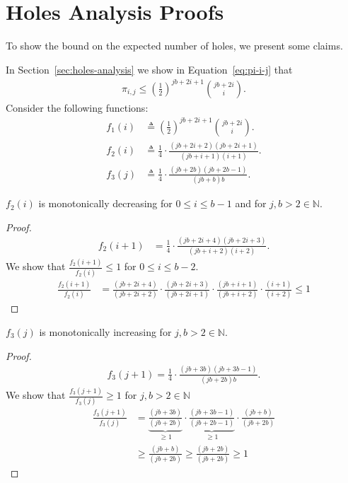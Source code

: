 \chapter{Holes Analysis Proofs}
\label{appendix:holes}

To show the bound on the expected number of holes, we present some claims. 

In Section~\ref{sec:holes-analysis} we show in Equation~\ref{eq:pi-i-j} that 
\begin{align*}
\pi_{i,j} \leq \left(\frac{1}{2}\right)^{jb + 2i +1} {{jb+2i} \choose i}.
\end{align*}
Consider the following functions:
\begin{align*}
f_1(i) &\triangleq \left(\frac{1}{2}\right)^{jb + 2i +1} {{jb+2i} \choose i}. \\
f_2(i) &\triangleq \frac{1}{4} \cdot \frac{(jb+2i+2)(jb+2i+1)}{(jb+i+1)(i+1)}. \\
f_3(j) &\triangleq \frac{1}{4} \cdot \frac{(jb+2b)(jb+2b-1)}{(jb+b)b}.
\end{align*}

\begin{claim}\label{claim:f-2-dec}
$f_2(i)$ is monotonically decreasing for $0 \leq i \leq b-1$ and for $j,b>2 \in \mathds{N}$. 
\end{claim}

\begin{proof}
\begin{align*}
    f_2(i+1) &= \frac{1}{4} \cdot \frac{(jb+2i+4)(jb+2i+3)}{(jb+i+2)(i+2)}.
\end{align*}
We show that $\frac{f_2(i+1)}{f_2(i)} \leq 1$ for $0 \leq i \leq b-2$.
\begin{align*}
    \frac{f_2(i+1)}{f_2(i)} &= \frac{(jb+2i+4)}{(jb+2i+2)} \cdot \frac{(jb+2i+3)}{(jb+2i+1)} \cdot \frac{(jb+i+1)}{(jb+i+2)} \cdot \frac{(i+1)}{(i+2)} 
    \leq 1
\end{align*}
\end{proof}

\begin{claim}\label{claim:f-3-inc}
$f_3(j)$ is monotonically increasing for $j,b>2 \in \mathds{N}$. 
\end{claim}

\begin{proof}
\begin{align*}
    f_3(j+1) = \frac{1}{4} \cdot \frac{(jb+3b)(jb+3b-1)}{(jb+2b)b}.
\end{align*}
We show that $\frac{f_3(j+1)}{f_3(j)} \geq 1$ for $j,b>2 \in \mathds{N}$
\begin{align*}
    \frac{f_3(j+1)}{f_3(j)} &= \underbrace{\frac{(jb+3b)}{(jb+2b)}}_{\geq 1} \cdot \underbrace{\frac{(jb+3b-1)}{(jb+2b-1)}}_{\geq 1} \cdot \frac{(jb+b)}{(jb+2b)} \\
    &\geq \frac{(jb+b)}{(jb+2b)} \geq \frac{(jb+2b)}{(jb+2b)}
    \geq 1 
\end{align*}
\end{proof}


